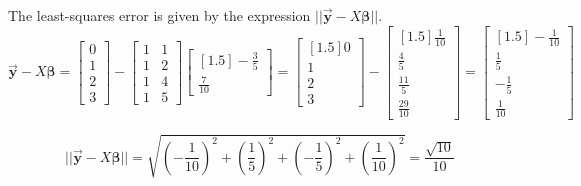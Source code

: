 \documentclass[letter,11pt]{article}
\theoremstyle{definition}
\begin{document}
\begin{tcolorbox}[boxrule=1mm,enhanced jigsaw, breakable,before=\hfill,after=\hfill,adjusted title={Problem 6 solutions}]
\begin{tcolorbox}[boxrule=0.25mm,enhanced jigsaw, breakable, colframe=red!75!black,colback=white,before=\hfill,after=\hfill]
\end{tcolorbox}

The least-squares error is given by the expression $||\vec{\boldsymbol{y}} - X\boldsymbol{\beta}||$.
$$\vec{\boldsymbol{y}} - X\boldsymbol{\beta} = \begin{bmatrix} 0\\ 1\\ 2\\ 3 \end{bmatrix} - \begin{bmatrix} 1 & 1\\ 1 & 2\\ 1 & 4\\ 1 & 5 \end{bmatrix}\begin{bmatrix}[1.5]
        -\frac{3}{5} \\ \frac{7}{10}
    \end{bmatrix} = \begin{bmatrix}[1.5] 0\\ 1\\ 2\\ 3 \end{bmatrix} - \begin{bmatrix}[1.5] \frac{1}{10}\\ \frac{4}{5}\\ \frac{11}{5}\\ \frac{29}{10} \end{bmatrix} = \begin{bmatrix}[1.5] -\frac{1}{10}\\ \frac{1}{5}\\ -\frac{1}{5}\\ \frac{1}{10} \end{bmatrix}$$

$$||\vec{\boldsymbol{y}} - X\boldsymbol{\beta}|| = \sqrt{\left(-\frac{1}{10}\right)^{2}+\left(\frac{1}{5}\right)^{2}+\left(-\frac{1}{5}\right)^{2}+\left(\frac{1}{10}\right)^{2}} = \frac{\sqrt{10}}{10}$$
\end{tcolorbox}
\end{document}
